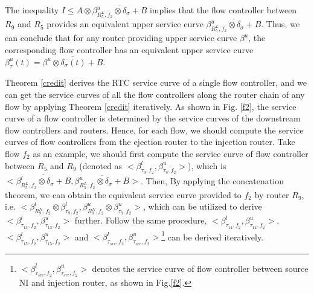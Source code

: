\documentclass[10pt,journal]{IEEEtran}
\begin{document}
\begin{IEEEproof}
The inequality $I\leq A\otimes \overline{\beta_{R_5^L,f_2}^u\otimes\delta_\sigma+B}$ implies that the flow controller between $R_9$ and $R_5$ provides an equivalent upper service curve $\overline{\beta_{R_5^L,f_2}^u\otimes\delta_\sigma+B}$. Thus, we can conclude that for any router providing upper service curve $\beta^u$, the corresponding flow controller has an equivalent upper service curve $\beta^{u}_\tau(t)=\overline{\beta^u\otimes\delta_\sigma(t)+B}$.
\end{IEEEproof}

Theorem \ref{credit} derives the RTC service curve of a single flow controller, and we can get the service curves of all the flow controllers along the router chain of any flow by applying Theorem \ref{credit} iteratively. As shown in Fig. \ref{f2}, the service curve of a flow controller is determined by the service curves of the downstream flow controllers and routers. Hence, for each flow, we should compute the service curves of flow controllers from the ejection router to the injection router. Take flow $f_2$ as an example, we should first compute the service curve of flow controller between $R_5$ and $R_{9}$ (denoted as $<\beta_{\tau_9,f_2}^l,\beta_{\tau_9,f_2}^u>$), which is $<\overline{\beta_{R_5^L,f_2}^l\otimes\delta_\sigma+B},\overline{\beta_{R_5^L,f_2}^u\otimes\delta_\sigma+B}>$. Then, By applying the concatenation theorem, we can obtain the equivalent service curve provided to $f_2$ by router $R_{9}$, i.e. $<\beta_{R_9^N,f_2}^l\otimes\beta_{\tau_9,f_2}^l,\beta_{R_9^N,f_2}^u\otimes\beta_{\tau_9,f_2}^u>$, which can be utilized to derive $<\beta_{\tau_{13},f_2}^l,\beta_{\tau_{13},f_2}^u>$ further. Follow the same procedure, $<\beta_{\tau_{14},f_2}^l,\beta_{\tau_{14},f_2}^u>$, $<\beta_{\tau_{15},f_2}^l,\beta_{\tau_{15},f_2}^u>$ and $<\beta_{\tau_{src},f_2}^l,\beta_{\tau_{src},f_2}^u>$\footnote{$<\beta_{\tau_{src},f_2}^l,\beta_{\tau_{src},f_2}^u>$ denotes the service curve of flow controller between source NI and injection router, as shown in Fig.\ref{f2}.} can be derived iteratively.
\end{document}
